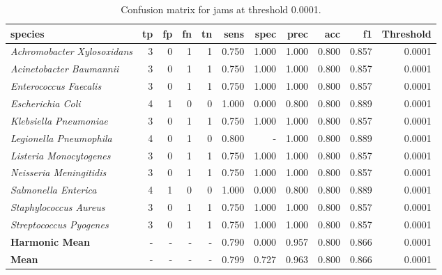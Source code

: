 \begin{table}[H]
\centering
\begin{tabular}{lrrrrrrrrrr}
\hline
\textbf{species} & \textbf{tp} & \textbf{fp} & \textbf{fn} & \textbf{tn} & \textbf{sens} & \textbf{spec} & \textbf{prec} & \textbf{acc} & \textbf{f1} & \textbf{Threshold} \\
\hline
\itshape Achromobacter Xylosoxidans & 3 & 0 & 1 & 1 & 0.750 & 1.000 & 1.000 & 0.800 & 0.857 & 0.0001 \\
\itshape Acinetobacter Baumannii & 3 & 0 & 1 & 1 & 0.750 & 1.000 & 1.000 & 0.800 & 0.857 & 0.0001 \\
\itshape Enterococcus Faecalis & 3 & 0 & 1 & 1 & 0.750 & 1.000 & 1.000 & 0.800 & 0.857 & 0.0001 \\
\itshape Escherichia Coli & 4 & 1 & 0 & 0 & 1.000 & 0.000 & 0.800 & 0.800 & 0.889 & 0.0001 \\
\itshape Klebsiella Pneumoniae & 3 & 0 & 1 & 1 & 0.750 & 1.000 & 1.000 & 0.800 & 0.857 & 0.0001 \\
\itshape Legionella Pneumophila & 4 & 0 & 1 & 0 & 0.800 & - & 1.000 & 0.800 & 0.889 & 0.0001 \\
\itshape Listeria Monocytogenes & 3 & 0 & 1 & 1 & 0.750 & 1.000 & 1.000 & 0.800 & 0.857 & 0.0001 \\
\itshape Neisseria Meningitidis & 3 & 0 & 1 & 1 & 0.750 & 1.000 & 1.000 & 0.800 & 0.857 & 0.0001 \\
\itshape Salmonella Enterica & 4 & 1 & 0 & 0 & 1.000 & 0.000 & 0.800 & 0.800 & 0.889 & 0.0001 \\
\itshape Staphylococcus Aureus & 3 & 0 & 1 & 1 & 0.750 & 1.000 & 1.000 & 0.800 & 0.857 & 0.0001 \\
\itshape Streptococcus Pyogenes & 3 & 0 & 1 & 1 & 0.750 & 1.000 & 1.000 & 0.800 & 0.857 & 0.0001 \\
\bfseries Harmonic Mean & - & - & - & - & 0.790 & 0.000 & 0.957 & 0.800 & 0.866 & 0.0001 \\
\bfseries Mean & - & - & - & - & 0.799 & 0.727 & 0.963 & 0.800 & 0.866 & 0.0001 \\
\end{tabular}
\caption{Confusion matrix for jams at threshold 0.0001.}
\label{tab:conf_jams_0.0001}
\end{table}
